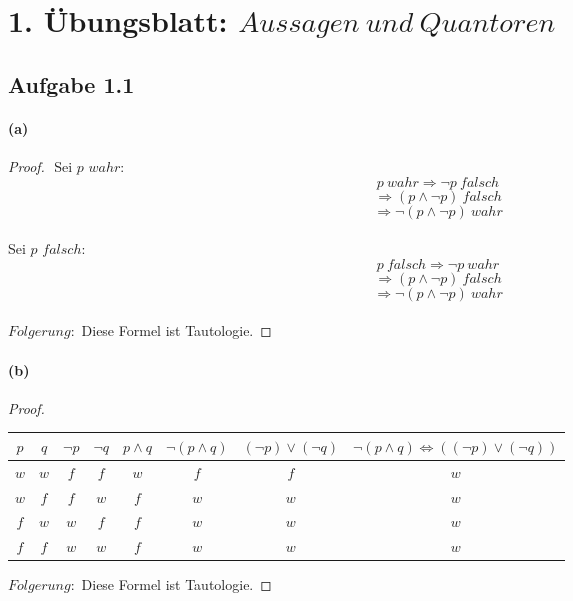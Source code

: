 \section{1. Übungsblatt: $Aussagen\ und\ Quantoren$}

\subsection{Aufgabe 1.1}

\paragraph{(a)}
\begin{proof}
$ $\newline
Sei $p$ $wahr$:
\begin{equation}
p\ wahr\Rightarrow\neg p\ falsch
\end{equation}
\begin{equation}
\Rightarrow (p\wedge\neg p)\ falsch
\end{equation}
\begin{equation}
\Rightarrow \neg(p\wedge\neg p)\ wahr
\end{equation}\\
Sei $p$ $falsch$:
\begin{equation}
p\ falsch\Rightarrow\neg p\ wahr
\end{equation}
\begin{equation}
\Rightarrow (p\wedge\neg p)\ falsch
\end{equation}
\begin{equation}
\Rightarrow \neg(p\wedge\neg p)\ wahr
\end{equation}\\
$Folgerung:$ Diese Formel ist Tautologie.
\end{proof}

\paragraph{(b)}
\begin{proof}
$ $\newline
\begin{center}
\begin{tabular}{||c|c||c|c|c|c|c|c||}
\hline
$p$ & $q$ & $\neg p$ & $\neg q$ & $p\wedge q$ & $\neg(p\wedge q)$ & $(\neg p)\vee (\neg q)$ & $\neg(p\wedge q)\Leftrightarrow((\neg p)\vee (\neg q))$ \\
\hline
\hline
$w$ & $w$ & $f$ & $f$ & $w$ & $f$ & $f$ & $w$ \\
$w$ & $f$ & $f$ & $w$ & $f$ & $w$ & $w$ & $w$ \\
$f$ & $w$ & $w$ & $f$ & $f$ & $w$ & $w$ & $w$ \\
$f$ & $f$ & $w$ & $w$ & $f$ & $w$ & $w$ & $w$ \\
\hline
\end{tabular}
\end{center}
$Folgerung:$ Diese Formel ist Tautologie.
\end{proof}

